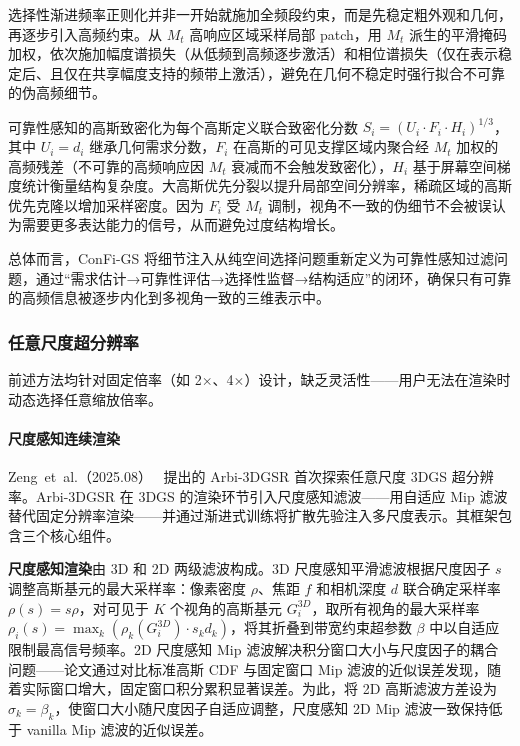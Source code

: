 选择性渐进频率正则化并非一开始就施加全频段约束，而是先稳定粗外观和几何，再逐步引入高频约束。从 $M_t$ 高响应区域采样局部 patch，用 $M_t$ 派生的平滑掩码加权，依次施加幅度谱损失（从低频到高频逐步激活）和相位谱损失（仅在表示稳定后、且仅在共享幅度支持的频带上激活），避免在几何不稳定时强行拟合不可靠的伪高频细节。

可靠性感知的高斯致密化为每个高斯定义联合致密化分数 $S_i = (U_i \cdot F_i \cdot H_i)^{1/3}$，其中 $U_i = d_i$ 继承几何需求分数，$F_i$ 在高斯的可见支撑区域内聚合经 $M_t$ 加权的高频残差（不可靠的高频响应因 $M_t$ 衰减而不会触发致密化），$H_i$ 基于屏幕空间梯度统计衡量结构复杂度。大高斯优先分裂以提升局部空间分辨率，稀疏区域的高斯优先克隆以增加采样密度。因为 $F_i$ 受 $M_t$ 调制，视角不一致的伪细节不会被误认为需要更多表达能力的信号，从而避免过度结构增长。

总体而言，ConFi-GS 将细节注入从纯空间选择问题重新定义为可靠性感知过滤问题，通过“需求估计→可靠性评估→选择性监督→结构适应”的闭环，确保只有可靠的高频信息被逐步内化到多视角一致的三维表示中。

\subsubsection{任意尺度超分辨率}

前述方法均针对固定倍率（如 2$\times$、4$\times$）设计，缺乏灵活性——用户无法在渲染时动态选择任意缩放倍率。

\paragraph{尺度感知连续渲染}

Zeng~et~al.（2025.08）~\cite{2508_16467} 提出的 Arbi-3DGSR 首次探索任意尺度 3DGS 超分辨率。Arbi-3DGSR 在 3DGS 的渲染环节引入尺度感知滤波——用自适应 Mip 滤波替代固定分辨率渲染——并通过渐进式训练将扩散先验注入多尺度表示。其框架包含三个核心组件。

\textbf{尺度感知渲染}由 3D 和 2D 两级滤波构成。3D 尺度感知平滑滤波根据尺度因子 $s$ 调整高斯基元的最大采样率：像素密度 $\rho$、焦距 $f$ 和相机深度 $d$ 联合确定采样率 $\rho(s) = s\rho$，对可见于 $K$ 个视角的高斯基元 $G_i^{3D}$，取所有视角的最大采样率 $\rho_i(s) = \max_k(\rho_k(G_i^{3D}) \cdot s_k d_k)$，将其折叠到带宽约束超参数 $\beta$ 中以自适应限制最高信号频率。2D 尺度感知 Mip 滤波解决积分窗口大小与尺度因子的耦合问题——论文通过对比标准高斯 CDF 与固定窗口 Mip 滤波的近似误差发现，随着实际窗口增大，固定窗口积分累积显著误差。为此，将 2D 高斯滤波方差设为 $\sigma_k = \beta_k$，使窗口大小随尺度因子自适应调整，尺度感知 2D Mip 滤波一致保持低于 vanilla Mip 滤波的近似误差。


